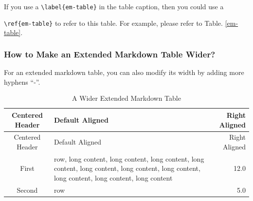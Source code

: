 \documentclass[10pt, a4paper, oneside]{article}
\begin{document}
If you use a \texttt{\textbackslash{}label\{em-table\}} in the table caption, then you could use a

\texttt{\textbackslash{}ref\{em-table\}} to refer to this table.
For example, please refer to Table. \ref{em-table}.

\subsubsection{How to Make an Extended Markdown Table Wider?}\label{how-to-make-an-extended-markdown-table-wider}

For an extended markdown table, you can also modify its width by adding more hyphens ``-''.

\begin{longtable}[c]{@{}clr@{}}
\caption{A Wider Extended Markdown Table \label{wem-table}}\tabularnewline
\toprule
\begin{minipage}[b]{0.27\columnwidth}\centering\strut
Centered
Header
\strut\end{minipage} & \begin{minipage}[b]{0.41\columnwidth}\raggedright\strut
Default
Aligned
\strut\end{minipage} & \begin{minipage}[b]{0.19\columnwidth}\raggedleft\strut
Right
Aligned
\strut\end{minipage}\tabularnewline
\midrule
\endfirsthead
\toprule
\begin{minipage}[b]{0.27\columnwidth}\centering\strut
Centered
Header
\strut\end{minipage} & \begin{minipage}[b]{0.41\columnwidth}\raggedright\strut
Default
Aligned
\strut\end{minipage} & \begin{minipage}[b]{0.19\columnwidth}\raggedleft\strut
Right
Aligned
\strut\end{minipage}\tabularnewline
\midrule
\endhead
\begin{minipage}[t]{0.27\columnwidth}\centering\strut
First
\strut\end{minipage} & \begin{minipage}[t]{0.41\columnwidth}\raggedright\strut
row,
long content,
long content,
long content,
long content,
long content,
long content,
long content,
long content,
long content,
long content
\strut\end{minipage} & \begin{minipage}[t]{0.19\columnwidth}\raggedleft\strut
12.0
\strut\end{minipage}\tabularnewline
\begin{minipage}[t]{0.27\columnwidth}\centering\strut
Second
\strut\end{minipage} & \begin{minipage}[t]{0.41\columnwidth}\raggedright\strut
row
\strut\end{minipage} & \begin{minipage}[t]{0.19\columnwidth}\raggedleft\strut
5.0
\strut\end{minipage}\tabularnewline
\bottomrule
\end{longtable}
\end{document}
